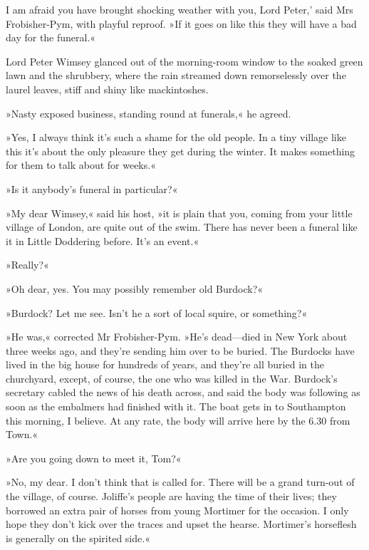 
\lettrine[lines=4,ante=‘]{I}{} am afraid you have brought shocking weather with you, Lord Peter,' said Mrs Frobisher-Pym, with playful reproof. »If it goes on like this they will have a bad day for the funeral.«

\zz
Lord Peter Wimsey glanced out of the morning-room window to the soaked green lawn and the shrubbery, where the rain streamed down remorselessly over the laurel leaves, stiff and shiny like mackintoshes.

»Nasty exposed business, standing round at funerals,« he agreed.

»Yes, I always think it's such a shame for the old people. In a tiny village like this it's about the only pleasure they get during the winter. It makes something for them to talk about for weeks.«

»Is it anybody's funeral in particular?«

»My dear Wimsey,« said his host, »it is plain that you, coming from your little village of London, are quite out of the swim. There has never been a funeral like it in Little Doddering before. It's an event.«

»Really?«

»Oh dear, yes. You may possibly remember old Burdock?«

»Burdock? Let me see. Isn't he a sort of local squire, or something?«

»He was,« corrected Mr Frobisher-Pym. »He's dead—died in New York about three weeks ago, and they're sending him over to be buried. The Burdocks have lived in the big house for hundreds of years, and they're all buried in the churchyard, except, of course, the one who was killed in the War. Burdock's secretary cabled the news of his death across, and said the body was following as soon as the embalmers had finished with it. The boat gets in to Southampton this morning, I believe. At any rate, the body will arrive here by the 6.30 from Town.«

»Are you going down to meet it, Tom?«

»No, my dear. I don't think that is called for. There will be a grand turn-out of the village, of course. Joliffe's people are having the time of their lives; they borrowed an extra pair of horses from young Mortimer for the occasion. I only hope they don't kick over the traces and upset the hearse. Mortimer's horseflesh is generally on the spirited side.«

